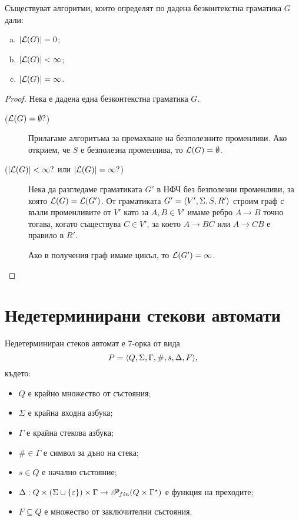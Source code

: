 \begin{thm}
  Съществуват алгоритми, които определят по дадена безконтекстна граматика $G$ дали:
  \begin{enumerate}[a)]
  \item 
    $\lvert{\mathcal{L}(G)}\rvert = 0$;
  \item
    $\lvert{\mathcal{L}(G)}\rvert < \infty$;
  \item
    $\lvert{\mathcal{L}(G)}\rvert = \infty$.
  \end{enumerate}
\end{thm}
\begin{proof}
  Нека е дадена една безконтекстна граматика $G$.
  \begin{description}
  \item[($\mathcal{L}(G) = \emptyset?$)]
    Прилагаме алгоритъма за премахване на безполезните променливи.
    Ако открием, че $S$ е безполезна променлива, то $\mathcal{L}(G) = \emptyset$.
  \item[($\lvert{\mathcal{L}(G)}\rvert < \infty?$ или $\lvert{\mathcal{L}(G)}\rvert = \infty?$)]
    Нека да разгледаме граматиката $G'$ в НФЧ без безполезни променливи, за която $\mathcal{L}(G) = \mathcal{L}(G')$.
    От граматиката $G' = \langle{V',\Sigma,S,R'}\rangle$ строим граф с възли променливите от $V'$ като
    за $A,B \in V'$ имаме ребро $A \to B$ точно тогава, когато съществува $C \in V'$,
    за което $A \to BC$ или $A \to CB$ е правило в $R'$.
    
    Ако в получения граф имаме цикъл, то $\mathcal{L}(G') = \infty$.
  \end{description}
\end{proof}

\section{Недетерминирани стекови автомати}

\begin{dfn}
  Недетерминиран стеков автомат е 7-орка от вида
  \[P = \langle{Q,\Sigma,\Gamma,\#,s,\Delta,F}\rangle,\] където:
  \begin{itemize}
  \item
    $Q$ е крайно множество от състояния;
  \item  
    $\Sigma$ е крайна входна азбука;
  \item
    $\Gamma$ е крайна стекова азбука;
  \item
    $\# \in \Gamma$ е символ за дъно на стека;
  \item
    $s\in Q$ е начално състояние;
  \item
    $\Delta:Q\times(\Sigma \cup \{\varepsilon\})\times\Gamma\rightarrow \mathscr{P}_{fin}(Q\times\Gamma^\star)$ 
    е функция на преходите;    
  \item
    $F\subseteq Q$ е множество от заключителни състояния.
  \end{itemize}
\end{dfn}

